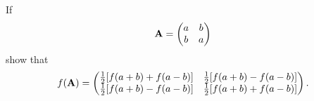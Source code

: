\documentclass[a4paper]{book}
\newcounter{exercise}[chapter]
\newcounter{solution}[chapter]
\newcommand{\A}{{\bf A}}
\begin{document}
\begin{solution}
\begin{itemize}
	\end{itemize}
	
	\end{solution}
	
	\begin{exercise}
	If
	\begin{equation*}
		\A = \begin{pmatrix} a & b \\ b & a \end{pmatrix}			
	\end{equation*}
	show that
	\begin{equation*}
		f(\A) = \begin{pmatrix}
		\frac{1}{2}[f(a+b)+f(a-b)] & \frac{1}{2}[f(a+b)-f(a-b)] \\
		\frac{1}{2}[f(a+b)-f(a-b)] & \frac{1}{2}[f(a+b)+f(a-b)]
		\end{pmatrix}.
	\end{equation*}
	\end{exercise}
	
\end{document}
